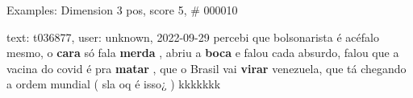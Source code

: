 \begin{frame}{Examples: Dimension 3 pos, score 5, \# 000010}
\footnotesize
\begin{exampleblock}{text: t036877, user: unknown, 2022-09-29}
percebi que bolsonarista é acéfalo mesmo, o \textbf{cara} só fala 
\textbf{merda} , abriu a \textbf{boca} e falou cada absurdo, falou que a vacina 
do covid é pra \textbf{matar} , que o Brasil vai \textbf{virar} venezuela, que 
tá chegando a ordem mundial ( sla oq é isso¿ ) kkkkkkk 
\end{exampleblock}
\end{frame}
